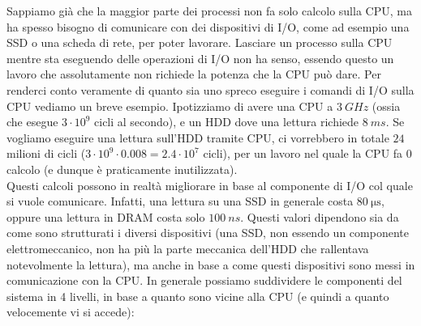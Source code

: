 \documentclass[11pt, a4paper, titlepage, oneside]{scrbook}
\begin{document}
Sappiamo già che la maggior parte dei processi non fa solo calcolo sulla CPU, ma ha spesso bisogno di comunicare con dei dispositivi di I/O, come ad esempio una SSD o una scheda di rete, per poter lavorare. Lasciare un processo sulla CPU mentre sta eseguendo delle operazioni di I/O non ha senso, essendo questo un lavoro che assolutamente non richiede la potenza che la CPU può dare. Per renderci conto veramente di quanto sia uno spreco eseguire i comandi di I/O sulla CPU vediamo un breve esempio. Ipotizziamo di avere una CPU a $\SI{3}{GHz}$ (ossia che esegue $3 \cdot 10^9$ cicli al secondo), e un HDD dove una lettura richiede $\SI{8}{ms}$. Se vogliamo eseguire una lettura sull'HDD tramite CPU, ci vorrebbero in totale $24$ milioni di cicli ($3 \cdot 10^9 \cdot 0.008 = 2.4 \cdot 10^7$ cicli), per un lavoro nel quale la CPU fa 0 calcolo (e dunque è praticamente inutilizzata). \\
Questi calcoli possono in realtà migliorare in base al componente di I/O col quale si vuole comunicare. Infatti, una lettura su una SSD in generale costa $\SI{80}{\micro\second}$, oppure una lettura in DRAM costa solo $\SI{100}{ns}$. Questi valori dipendono sia da come sono strutturati i diversi dispositivi (una SSD, non essendo un componente elettromeccanico, non ha più la parte meccanica dell'HDD che rallentava notevolmente la lettura), ma anche in base a come questi dispositivi sono messi in comunicazione con la CPU. In generale possiamo suddividere le componenti del sistema in 4 livelli, in base a quanto sono vicine alla CPU (e quindi a quanto velocemente vi si accede):
\end{document}
